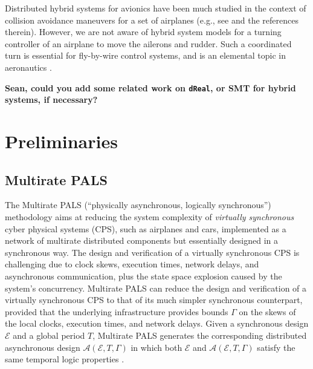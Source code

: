 \documentclass{sig-alternate}
\begin{document}
Distributed hybrid systems for avionics have been much studied
in the context of collision avoidance maneuvers for a set of airplanes
(e.g., see \cite{loos-hscc13} and the references therein).
However, we are not aware of hybrid system models for a turning 
controller of an airplane to move the ailerons and rudder.
Such a coordinated turn is essential for fly-by-wire control systems,
and is an elemental topic in aeronautics \cite{anderson2005introduction}.



\textbf{Sean, could you add some related work on \texttt{dReal}, or SMT for hybrid systems,
if necessary?}




\newpage



\section{Preliminaries}

\subsection{Multirate PALS} 

The Multirate PALS (``physically asynchronous,  logically synchronous'') 
methodology \cite{pals-rtss09,mr-pals-journal,pals-tcs}
aims at reducing the system complexity 
of \emph{virtually synchronous}  cyber physical systems (CPS),
such as airplanes and cars,
implemented as a network of multirate distributed components but essentially designed in a synchronous way.
%
The design and verification of a virtually synchronous CPS
is challenging  due to
clock skews,
execution times, 
network delays, and asynchronous communication,
plus the state space explosion caused by the system's concurrency. 
%
Multirate PALS can reduce
the design and verification of a virtually synchronous CPS to
that of its much simpler synchronous counterpart,
provided that the underlying infrastructure provides bounds $\Gamma$
on the skews of the local clocks, 
execution times,  and network delays. 
%
Given a synchronous design $\mathcal{E}$ and a global period $T$,
Multirate PALS generates
the corresponding distributed asynchronous 
design $\mathcal{A}(\mathcal{E}, T, \Gamma)$
in which both $\mathcal{E}$ and $\mathcal{A}(\mathcal{E}, T, \Gamma)$
satisfy the same temporal logic properties \cite{mr-pals-journal,pals-tcs}.
%
\end{document}
